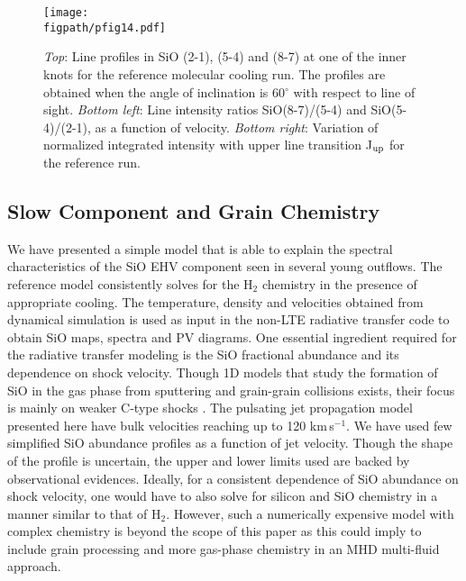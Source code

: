 \documentclass[useAMS,usenatbib]{mn2e}
\newcommand{\figpath}{../NEWFIGS}
\begin{document}
\begin{figure*}
 \texttt{[image: \\figpath/pfig14.pdf]}%
 \caption{{\em{Top}}: Line profiles in SiO (2-1), (5-4) and (8-7) at one
   of the inner knots for the reference molecular cooling run. The profiles are
   obtained when the angle of inclination is 60$^{\circ}$ with respect
 to line of sight. {\em{Bottom left}}: Line intensity ratios SiO(8-7)/(5-4)
and SiO(5-4)/(2-1), as a function of velocity. {\em{Bottom right}}:
Variation of normalized integrated intensity with upper line transition J$_{\rm
  up}$ for the reference run.}
\label{fig:lineratio}
\end{figure*}


\subsection{Slow Component and Grain Chemistry}
%
We have presented a simple model that is able to explain the spectral characteristics
of the SiO EHV component seen
in several young outflows. The reference model
consistently solves for the H$_{2}$ chemistry in the presence of
appropriate cooling. The temperature, density and velocities obtained from dynamical
simulation is used as input in the non-LTE radiative transfer code to obtain SiO maps, spectra and PV
diagrams. One essential ingredient required for the radiative transfer modeling
is the SiO fractional abundance and its dependence on shock velocity. 
Though 1D models that study the formation of SiO in the gas phase from
sputtering and grain-grain 
collisions exists, their focus is mainly on weaker C-type shocks
\citep{Schilke:1997p14140, Caselli:1997p14853, Gusdorf:2008p13800, VanLoo:2013p16573}. 
The pulsating jet propagation model presented here have bulk velocities
reaching up to 120 km\,s$^{-1}$. We have used few
simplified SiO abundance profiles as a function of jet
velocity. Though the shape of the profile is uncertain, the upper and
lower limits used are backed by observational evidences. Ideally, for a consistent
dependence of SiO abundance on shock velocity, one would have to also
solve for silicon and SiO chemistry in a manner similar to that of
H$_{2}$. However, such a numerically expensive model 
with complex chemistry is beyond the scope of this paper 
as this could imply to include grain processing and more gas-phase
chemistry in an MHD multi-fluid approach.  
%
\end{document}
